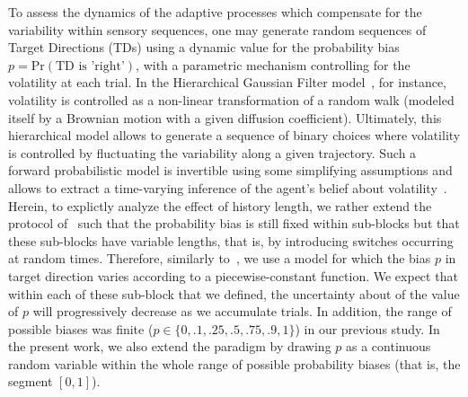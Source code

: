 \documentclass[10pt,letterpaper]{article}
\newcommand{\citep}[1]{\cite{#1}}
\newcommand{\citet}[1]{\cite{#1}}
\newcommand{\Rone}[1]{\textbf{\textcolor{magenta}{[rev 1: #1]}}}
\begin{document}
To assess the dynamics of the adaptive processes
which compensate for the variability within sensory sequences,
one may generate random sequences of Target Directions (TDs)
using a dynamic value for the probability bias $p = \text{Pr}(\text{TD is 'right'})$,
with a parametric mechanism controlling for the volatility at each trial.
In the Hierarchical Gaussian Filter model~\citep{Mathys11}, for instance,
volatility is controlled as a non-linear transformation
of a random walk (modeled itself by a Brownian motion with a given diffusion coefficient).
Ultimately, this hierarchical model allows to generate a sequence of binary choices
where volatility is controlled by fluctuating the variability along a given trajectory.
Such a forward probabilistic model is invertible
using some simplifying assumptions and allows
to extract a time-varying inference of the agent's belief about volatility~\citep{Vossel14}.
Herein, to explictly analyze the effect of history length,
we rather extend the protocol of~\citet{Montagnini2010} such that the probability bias
is still fixed within sub-blocks but that these sub-blocks have variable lengths,
that is, by introducing switches occurring at random times.
Therefore, similarly to~\citet{Meyniel13}, we use a model for which
the bias $p$ in target direction varies according to a piecewise-constant function.
We expect that within each of these sub-block that we defined,
the uncertainty about of the value of $p$
will progressively decrease as we accumulate trials.
In addition, the range of possible biases was finite ($p \in \{0, .1, .25, .5, .75, .9, 1\}$) in our previous study.
In the present work, we also extend the paradigm
by drawing $p$ as a continuous random variable
within the whole range of possible probability biases (that is, the segment $[ 0, 1 ]$).
\end{document}
